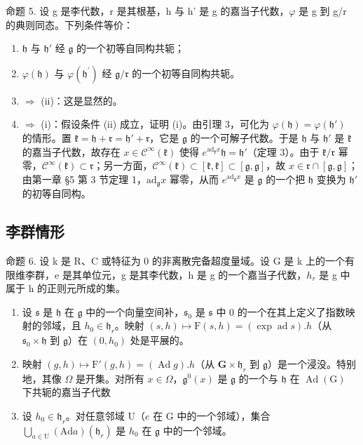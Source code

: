 命题 5. 设 g 是李代数，r 是其根基，h 与 h' 是 g 的嘉当子代数，\(\varphi\) 是 g 到 g/r 的典则同态。下列条件等价：

\begin{enumerate}
\def\labelenumi{(\roman{enumi})}
\item
  \(\mathfrak{h}\) 与 \(\mathfrak{h}'\) 经 \(\mathfrak{g}\) 的一个初等自同构共轭；
\item
  \(\varphi (\mathfrak{h})\) 与 \(\varphi (\mathfrak{h}^{\prime})\) 经 \(\mathfrak{g} / \mathfrak{r}\) 的一个初等自同构共轭。
\item
  \(\Longrightarrow\) (ii)：这是显然的。
\item
  \(\Longrightarrow\) (i)：假设条件 (ii) 成立，证明 (i)。由引理 3，可化为 \(\varphi(\mathfrak{h}) = \varphi(\mathfrak{h}')\) 的情形。置 \(\mathfrak{k} = \mathfrak{h} + \mathfrak{r} = \mathfrak{h}' + \mathfrak{r}\)，它是 \(\mathfrak{g}\) 的一个可解子代数。于是 \(\mathfrak{h}\) 与 \(\mathfrak{h}'\) 是 \(\mathfrak{k}\) 的嘉当子代数，故存在 \(x \in \mathcal{C}^{\infty}(\mathfrak{k})\) 使得 \(e^{\mathrm{ad}_{\mathfrak{k}}x}\mathfrak{h} = \mathfrak{h}'\)（定理 3）。由于 \(\mathfrak{k}/\mathfrak{r}\) 幂零，\(\mathcal{C}^{\infty}(\mathfrak{k}) \subset \mathfrak{r}\)；另一方面，\(\mathcal{C}^{\infty}(\mathfrak{k}) \subset [\mathfrak{k},\mathfrak{k}] \subset [\mathfrak{g},\mathfrak{g}]\)，故 \(x \in \mathfrak{r} \cap [\mathfrak{g},\mathfrak{g}]\)；由第一章 §5 第 3 节定理 1，\(\mathrm{ad}_{\mathfrak{g}}x\) 幂零，从而 \(e^{\mathrm{ad}_{\mathfrak{g}}x}\) 是 \(\mathfrak{g}\) 的一个把 \(\mathfrak{h}\) 变换为 \(\mathfrak{h}'\) 的初等自同构。
\end{enumerate}

\subsection{李群情形}

命题 6. 设 k 是 R、C 或特征为 0 的非离散完备超度量域。设 G 是 k 上的一个有限维李群，e 是其单位元，g 是其李代数，h 是 g 的一个嘉当子代数，\(h_{r}\) 是 g 中属于 h 的正则元所成的集。

\begin{enumerate}
\def\labelenumi{(\roman{enumi})}
\item
  设 \(\mathfrak{s}\) 是 \(\mathfrak{h}\) 在 \(\mathfrak{g}\) 中的一个向量空间补，\(\mathfrak{s}_0\) 是 \(\mathfrak{s}\) 中 0 的一个在其上定义了指数映射的邻域，且 \(h_0 \in \mathfrak{h}_r\)。映射 \((s, h) \mapsto \mathrm{F}(s, h) = (\exp \operatorname{ad} s).h\)（从 \(\mathfrak{s}_0 \times \mathfrak{h}\) 到 \(\mathfrak{g}\)）在 \((0, h_0)\) 处是平展的。
\item
  映射 \((g,h)\mapsto \mathrm{F}'(g,h) = (\operatorname {Ad}g).h\)（从 \(\mathbf{G}\times \mathfrak{h}_r\) 到 \(\mathfrak{g}\)）是一个浸没。特别地，其像 \(\Omega\) 是开集。对所有 \(x\in \Omega\)，\(\mathfrak{g}^0 (x)\) 是 \(\mathfrak{g}\) 的一个与 \(\mathfrak{h}\) 在 \(\operatorname {Ad}(\mathrm{G})\) 下共轭的嘉当子代数
\item
  设 \(h_0 \in \mathfrak{h}_r\)。对任意邻域 \(\mathrm{U}\)（\(e\) 在 \(\mathrm{G}\) 中的一个邻域），集合 \(\bigcup_{a \in \mathrm{U}} (\mathrm{Ad}a)(\mathfrak{h}_r)\) 是 \(h_0\) 在 \(\mathfrak{g}\) 中的一个邻域。
\end{enumerate}

